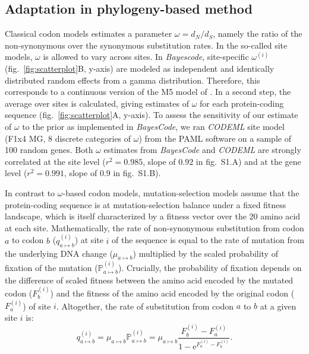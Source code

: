 \documentclass{article}
\newcommand{\e}{\mathrm{e}}
\newcommand{\dn}{d_N}
\newcommand{\ds}{d_S}
\newcommand{\dnds}{\dn / \ds}
\newcommand{\proba}{\mathbb{P}}
\begin{document}
    \subsection*{Adaptation in phylogeny-based method}
    Classical codon models estimates a parameter $\omega=\dnds$, namely the ratio of the non-synonymous over the synonymous substitution rates\cite{muse_likelihood_1994,goldman_codonbased_1994}.
    In the so-called site models, $\omega$ is allowed to vary across sites\cite{yang_codonsubstitution_2000, huelsenbeck_dirichlet_2006}.
    In \textit{Bayescode}, site-specific $\omega^{(i)}$ (fig.~\ref{fig:scatterplot}B, y-axis) are modeled as independent and identically distributed random effects from a gamma distribution\cite{lartillot_phylobayes_2013}.
    Therefore, this corresponds to a continuous version of the M5 model of \textcite{yang_codonsubstitution_2000}.
    In a second step, the average over sites is calculated, giving estimates of $\omega$ for each protein-coding sequence (fig.~\ref{fig:scatterplot}A, y-axis).
    To assess the sensitivity of our estimate of $\omega$ to the prior as implemented in \textit{BayesCode}, we ran \textit{CODEML} site model (F1x4 MG, 8 discrete categories of $\omega$) from the PAML software\cite{yang_paml_2007} on a sample of 100 random genes.
    Both $\omega$ estimates from \textit{BayesCode} and \textit{CODEML} are strongly correlated at the site level ($r^2=0.985$, slope of $0.92$ in fig.~S1.A) and at the gene level ($r^2=0.991$, slope of $0.9$ in fig.~S1.B).

    In contrast to $\omega$-based codon models, mutation-selection models assume that the protein-coding sequence is at mutation-selection balance under a fixed fitness landscape, which is itself characterized by a fitness vector over the $20$ amino acid at each site\cite{yang_mutationselection_2008, halpern_evolutionary_1998, rodrigue_mechanistic_2010}.
    Mathematically, the rate of non-synonymous substitution from codon $a$ to codon $b$ ($q_{a \mapsto b}^{(i)}$) at site $i$ of the sequence is equal to the rate of mutation from the underlying DNA change ($\mu_{a \mapsto b}$) multiplied by the scaled probability of fixation of the mutation ($\proba_{a \mapsto b}^{(i)}$).
    Crucially, the probability of fixation depends on the difference of scaled fitness between the amino acid encoded by the mutated codon ($F_b^{(i)}$) and the fitness of the amino acid encoded by the original codon ($F_a^{(i)}$) of site $i$\cite{wright_evolution_1931, fisher_genetical_1930}.
    Altogether, the rate of substitution from codon $a$ to $b$ at a given site $i$ is:
    \begin{equation}
        q_{a \mapsto b}^{(i)} = \mu_{a \mapsto b} \proba_{a \mapsto b}^{(i)} = \mu_{a \mapsto b} \dfrac{F_b^{(i)} - F_a^{(i)}}{1 - \e^{F_a^{(i)} - F_b^{(i)}}}.
    \end{equation}
\end{document}
